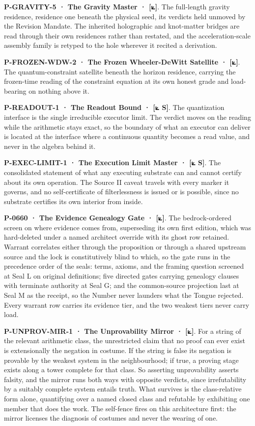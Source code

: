 \documentclass[10pt,twocolumn]{article}
\begin{document}
\textbf{P-GRAVITY-5 · The Gravity Master · {[}⟀{]}}. The full-length
gravity residence, residence one beneath the physical seed, its verdicts
held unmoved by the Revision Mandate. The inherited holographic and
knot-matter bridges are read through their own residences rather than
restated, and the acceleration-scale assembly family is retyped to the
hole wherever it recited a derivation.

\textbf{P-FROZEN-WDW-2 · The Frozen Wheeler-DeWitt Satellite · {[}⟀{]}}.
The quantum-constraint satellite beneath the horizon residence, carrying
the frozen-time reading of the constraint equation at its own honest
grade and load-bearing on nothing above it.

\textbf{P-READOUT-1 · The Readout Bound · {[}⟀ S{]}}. The quantization
interface is the single irreducible executor limit. The verdict moves on
the reading while the arithmetic stays exact, so the boundary of what an
executor can deliver is located at the interface where a continuous
quantity becomes a read value, and never in the algebra behind it.

\textbf{P-EXEC-LIMIT-1 · The Execution Limit Master · {[}⟀ S{]}}. The
consolidated statement of what any executing substrate can and cannot
certify about its own operation. The Source II caveat travels with every
marker it governs, and no self-certificate of filterlessness is issued
or is possible, since no substrate certifies its own interior from
inside.

\textbf{P-0660 · The Evidence Genealogy Gate · {[}⟀{]}}. The
bedrock-ordered screen on where evidence comes from, superseding its own
first edition, which was hard-deleted under a named architect override
with its ghost row retained. Warrant correlates either through the
proposition or through a shared upstream source and the lock is
constitutively blind to which, so the gate runs in the precedence order
of the seals: terms, axioms, and the framing question screened at Seal L
on original definitions; five directed gates carrying genealogy clauses
with terminate authority at Seal G; and the common-source projection
last at Seal M as the receipt, so the Number never launders what the
Tongue rejected. Every warrant row carries its evidence tier, and the
two weakest tiers never carry load.

\textbf{P-UNPROV-MIR-1 · The Unprovability Mirror · {[}⟀{]}}. For a
string of the relevant arithmetic class, the unrestricted claim that no
proof can ever exist is extensionally the negation in costume. If the
string is false its negation is provable by the weakest system in the
neighbourhood; if true, a proving stage exists along a tower complete
for that class. So asserting unprovability asserts falsity, and the
mirror runs both ways with opposite verdicts, since irrefutability by a
suitably complete system entails truth. What survives is the
class-relative form alone, quantifying over a named closed class and
refutable by exhibiting one member that does the work. The self-fence
fires on this architecture first: the mirror licenses the diagnosis of
costumes and never the wearing of one.
\end{document}

